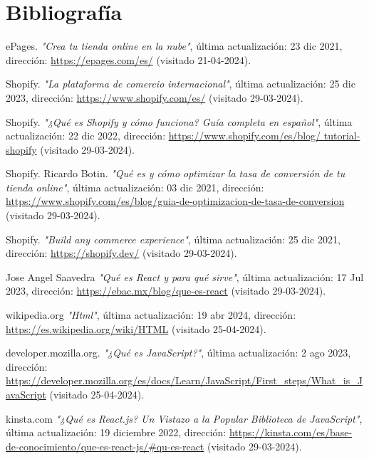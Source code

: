 \documentclass[12pt]{article}
\begin{document}
\section{Bibliografía}
\renewcommand{\refname}{}
\begin{thebibliography}{100} %
    
    ePages. 
    \textit{"Crea tu tienda online en la nube"}, última actualización: 23 dic 2021, dirección: \url{https://epages.com/es/} (visitado 21-04-2024).

    Shopify. 
    \textit{"La plataforma de comercio internacional"}, última actualización: 25 dic 2023, dirección: \url{https://www.shopify.com/es/} (visitado 29-03-2024).

    Shopify. 
    \textit{ "¿Qué es Shopify y cómo funciona? Guía completa en español"},  última actualización: 22 dic 2022, dirección: \url{https://www.shopify.com/es/blog/
    tutorial-shopify} (visitado 29-03-2024).

    Shopify. Ricardo Botin. 
    \textit{"Qué es y cómo optimizar la tasa de conversión de tu tienda online"}, última actualización: 03 dic 2021, dirección: \url{https://www.shopify.com/es/blog/guia-de-optimizacion-de-tasa-de-conversion} (visitado 29-03-2024).

    Shopify. 
    \textit{"Build any commerce experience"}, última actualización: 25 dic 2021, dirección: \url{https://shopify.dev/} (visitado 29-03-2024).

    Jose Angel Saavedra
    \textit{"Qué es React y para qué sirve"}, última actualización: 17 Jul 2023, dirección: \url{https://ebac.mx/blog/que-es-react} (visitado 29-03-2024).

    wikipedia.org
    \textit{"Html"}, última actualización: 19 abr 2024, dirección: \url{https://es.wikipedia.org/wiki/HTML} (visitado 25-04-2024).

    developer.mozilla.org.
    \textit{"¿Qué es JavaScript?"}, última actualización: 2 ago 2023, dirección: \url{https://developer.mozilla.org/es/docs/Learn/JavaScript/First_steps/What_is_JavaScript} (visitado 25-04-2024).

    kinsta.com
    \textit{"¿Qué es React.js? Un Vistazo a la Popular Biblioteca de JavaScript"}, última actualización: 19 diciembre 2022, dirección: \url{https://kinsta.com/es/base-de-conocimiento/que-es-react-js/#qu-es-react} (visitado 29-03-2024).


\end{thebibliography}
\end{document}

